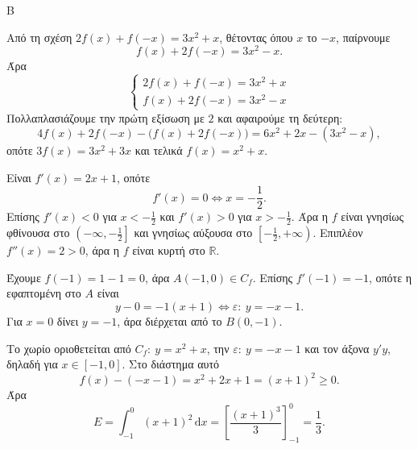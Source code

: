 \begin{thema}{Β}
\begin{erwthma}
\item Από τη σχέση $2f(x)+f(-x)=3x^2+x$, θέτοντας όπου $x$ το $-x$, παίρνουμε
\[
f(x)+2f(-x)=3x^2-x.
\]
Άρα
\[
\begin{cases}
2f(x)+f(-x)=3x^2+x\\
f(x)+2f(-x)=3x^2-x
\end{cases}
\]
Πολλαπλασιάζουμε την πρώτη εξίσωση με $2$ και αφαιρούμε τη δεύτερη:
\[
4f(x)+2f(-x)-\bigl(f(x)+2f(-x)\bigr)=6x^2+2x-(3x^2-x),
\]
οπότε $3f(x)=3x^2+3x$ και τελικά $f(x)=x^2+x$.

\item Είναι $f'(x)=2x+1$, οπότε
\[
f'(x)=0\Leftrightarrow x=-\frac12.
\]
Επίσης $f'(x)<0$ για $x<-\frac12$ και $f'(x)>0$ για $x>-\frac12$. Άρα η $f$ είναι γνησίως φθίνουσα στο $\left(-\infty,-\frac12\right]$ και γνησίως αύξουσα στο $\left[-\frac12,+\infty\right)$. Επιπλέον $f''(x)=2>0$, άρα η $f$ είναι κυρτή στο $\mathbb{R}$.

\item Έχουμε $f(-1)=1-1=0$, άρα $A(-1,0)\in C_f$. Επίσης $f'(-1)=-1$, οπότε η εφαπτομένη στο $A$ είναι
\[
y-0=-1(x+1)\Leftrightarrow \varepsilon:\ y=-x-1.
\]
Για $x=0$ δίνει $y=-1$, άρα διέρχεται από το $B(0,-1)$.

\item Το χωρίο οριοθετείται από $C_f:\ y=x^2+x$, την $\varepsilon:\ y=-x-1$ και τον άξονα $y'y$, δηλαδή για $x\in[-1,0]$. Στο διάστημα αυτό
\[
f(x)-(-x-1)=x^2+2x+1=(x+1)^2\ge0.
\]
Άρα
\[
E=\int_{-1}^{0}(x+1)^2\,\mathrm{d}x
=\left[\frac{(x+1)^3}{3}\right]_{-1}^{0}
=\frac13.
\]
\end{erwthma}
\end{thema}



